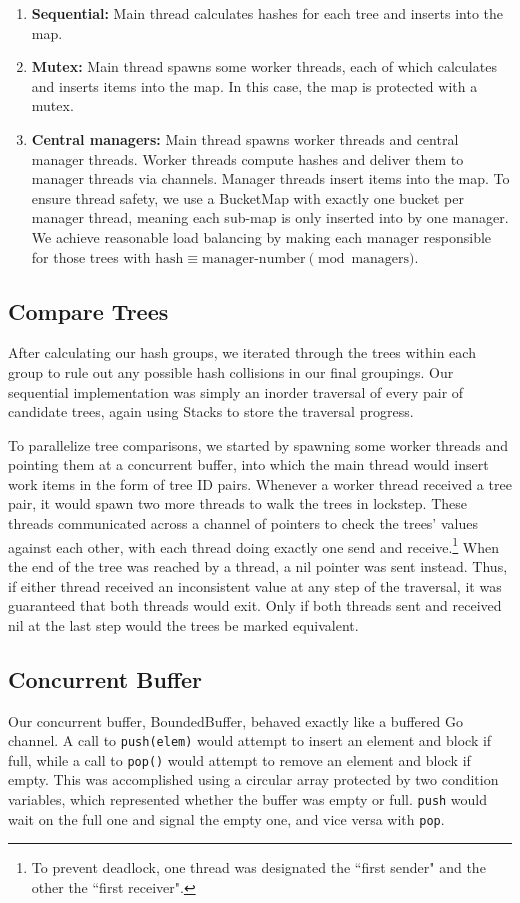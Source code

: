 \documentclass[11pt]{article}
\begin{document}
\begin{enumerate}
    \item \textbf{Sequential:} Main thread calculates hashes for each tree and inserts into the map.
    \item \textbf{Mutex:} Main thread spawns some worker threads, each of which calculates and inserts items into the map. In this case, the map is protected with a mutex.
    \item \textbf{Central managers:} Main thread spawns worker threads and central manager threads. Worker threads compute hashes and deliver them to manager threads via channels. Manager threads insert items into the map. To ensure thread safety, we use a BucketMap with exactly one bucket per manager thread, meaning each sub-map is only inserted into by one manager. We achieve reasonable load balancing by making each manager responsible for those trees with $\text{hash} \equiv \text{manager-number} \pmod{\text{managers}}$.
\end{enumerate}

\subsection{Compare Trees}
After calculating our hash groups, we iterated through the trees within each group to rule out any possible hash collisions in our final groupings. Our sequential implementation was simply an inorder traversal of every pair of candidate trees, again using Stacks to store the traversal progress.

To parallelize tree comparisons, we started by spawning some worker threads and pointing them at a concurrent buffer, into which the main thread would insert work items in the form of tree ID pairs. Whenever a worker thread received a tree pair, it would spawn two more threads to walk the trees in lockstep. These threads communicated across a channel of pointers to check the trees' values against each other, with each thread doing exactly one send and receive.\footnote{To prevent deadlock, one thread was designated the ``first sender" and the other the ``first receiver".} When the end of the tree was reached by a thread, a nil pointer was sent instead. Thus, if either thread received an inconsistent value at any step of the traversal, it was guaranteed that both threads would exit. Only if both threads sent and received nil at the last step would the trees be marked equivalent.

\subsection{Concurrent Buffer}
Our concurrent buffer, BoundedBuffer, behaved exactly like a buffered Go channel. A call to \texttt{push(elem)} would attempt to insert an element and block if full, while a call to \texttt{pop()} would attempt to remove an element and block if empty. This was accomplished using a circular array protected by two condition variables, which represented whether the buffer was empty or full. \texttt{push} would wait on the full one and signal the empty one, and vice versa with \texttt{pop}.
\end{document}
